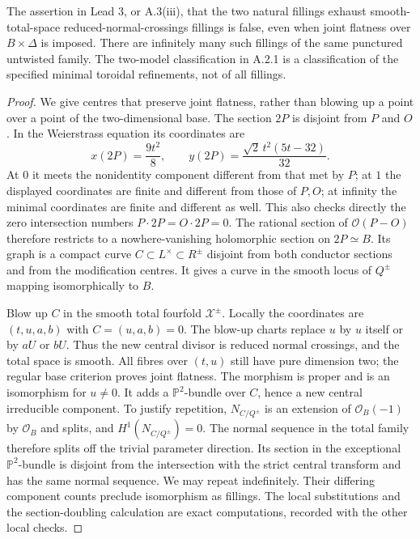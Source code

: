 \begin{proposition}\label{push:A33}
The assertion in Lead 3, or A.3(iii), that the two natural
fillings exhaust smooth-total-space reduced-normal-crossings
fillings is false, even when joint flatness over
$B\times\Delta$ is imposed. There are infinitely many such
fillings of the same punctured untwisted family. The
two-model classification in A.2.1 is a classification of the
specified minimal toroidal refinements, not of all fillings.
\end{proposition}
\begin{proof}
We give centres that preserve joint flatness, rather than
blowing up a point over a point of the two-dimensional base.
The section $2P$ is disjoint from $P$ and $O$. In the
Weierstrass equation its coordinates are
\[
 x(2P)=\frac{9t^2}{8},\qquad
 y(2P)=\frac{\sqrt2\,t^2(5t-32)}{32}.
\]
At $0$ it meets the nonidentity component different from
that met by $P$; at $1$ the displayed coordinates are finite
and different from those of $P,O$; at infinity the minimal
coordinates are finite and different as well. This also
checks directly the zero intersection numbers
$P\cdot2P=O\cdot2P=0$. The rational section of
$\mathcal O(P-O)$ therefore restricts to a nowhere-vanishing
holomorphic section on $2P\simeq B$. Its graph is a compact
curve $C\subset L^\times\subset R^\pm$ disjoint from both
conductor sections and from the modification centres.
It gives a curve in the smooth locus of $Q^\pm$ mapping
isomorphically to $B$.

Blow up $C$ in the smooth total fourfold $\mathcal X^\pm$.
Locally the coordinates are $(t,u,a,b)$ with
$C=(u,a,b)=0$. The blow-up charts replace $u$ by $u$ itself
or by $aU$ or $bU$. Thus the new central divisor is reduced
normal crossings, and the total space is smooth. All fibres
over $(t,u)$ still have pure dimension two; the regular base
criterion proves joint flatness. The morphism is proper and
is an isomorphism for $u\ne0$. It adds a
$\mathbb P^2$-bundle over $C$, hence a new central irreducible
component. To justify repetition, $N_{C/Q^\pm}$ is an extension
of $\mathcal O_B(-1)$ by $\mathcal O_B$ and splits, and
$H^1(N_{C/Q^\pm})=0$. The normal sequence in the total family
therefore splits off the trivial parameter direction. Its
section in the exceptional $\mathbb P^2$-bundle is disjoint
from the intersection with the strict central transform and
has the same normal sequence. We may repeat indefinitely.
Their differing component counts preclude
isomorphism as fillings. The local substitutions and the
section-doubling calculation are exact computations, recorded
with the other local checks.
\end{proof}

